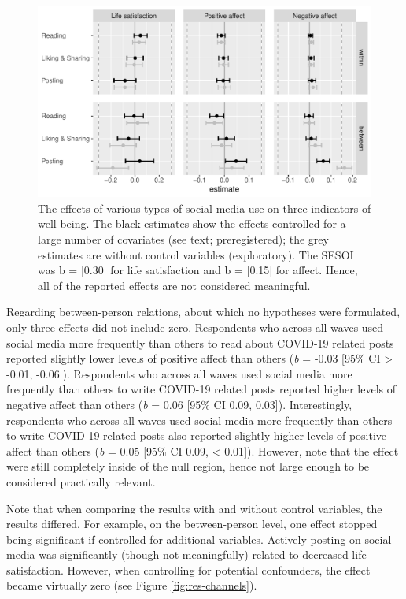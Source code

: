 \documentclass[
  english,
  man,floatsintext]{apa6}
\begin{document}
\begin{figure}
\includegraphics[width=\textwidth]{figures/fig_results_activity} \caption{The effects of various types of social media use on three indicators of well-being. The black estimates show the effects controlled for a large number of covariates (see text; preregistered); the grey estimates are without control variables (exploratory). The SESOI was b = |0.30| for life satisfaction and b = |0.15| for affect. Hence, all of the reported effects are not considered meaningful.}\label{fig:res-activity}
\end{figure}

Regarding between-person relations, about which no hypotheses were formulated, only three effects did not include zero.
Respondents who across all waves used social media more frequently than others to read about COVID-19 related posts reported slightly lower levels of positive affect than others (\emph{b} = -0.03 {[}95\% CI \textgreater{} -0.01, -0.06{]}).
Respondents who across all waves used social media more frequently than others to write COVID-19 related posts reported higher levels of negative affect than others (\emph{b} = 0.06 {[}95\% CI 0.09, 0.03{]}).
Interestingly, respondents who across all waves used social media more frequently than others to write COVID-19 related posts also reported slightly higher levels of positive affect than others (\emph{b} = 0.05 {[}95\% CI 0.09, \textless{} 0.01{]}).
However, note that the effect were still completely inside of the null region, hence not large enough to be considered practically relevant.

Note that when comparing the results with and without control variables, the results differed.
For example, on the between-person level, one effect stopped being significant if controlled for additional variables.
Actively posting on social media was significantly (though not meaningfully) related to decreased life satisfaction.
However, when controlling for potential confounders, the effect became virtually zero (see Figure \ref{fig:res-channels}).
\end{document}
